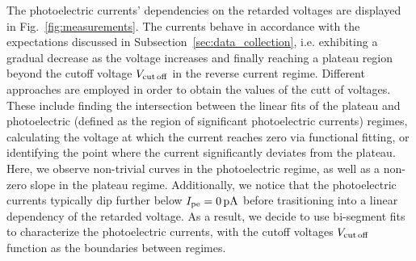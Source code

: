 \documentclass[aps,twocolumn,secnumarabic,balancelastpage,amsmath,amssymb,nofootinbib,floatfix]{revtex4-1}
\newcommand{\pA}{\,{\rm pA}}
\begin{document}
The photoelectric currents' dependencies on the retarded voltages are displayed in Fig.~\ref{fig:measurements}. The currents behave in accordance with the expectations discussed in Subsection~\ref{sec:data_collection}, i.e. exhibiting a gradual decrease as the voltage increases and finally reaching a plateau region beyond the cutoff voltage $V_{\rm{cut\,off}}$ in the reverse current regime. Different approaches are employed in order to obtain the values of the cutt of voltages. These include finding the intersection between the linear fits of the plateau and photoelectric (defined as the region of significant photoelectric currents) regimes, calculating the voltage at which the current reaches zero via functional fitting, or identifying the point where the current significantly deviates from the plateau. Here, we observe non-trivial curves in the photoelectric regime, as well as a non-zero slope in the plateau regime. Additionally, we notice that the photoelectric currents typically dip further below $I_{\rm{pe}} = 0\pA$ before trasitioning into a linear dependency of the retarded voltage. As a result, we decide to use bi-segment fits to characterize the photoelectric currents, with the cutoff voltages $V_{\rm{cut\,off}}$ function as the boundaries between regimes.
\end{document}
